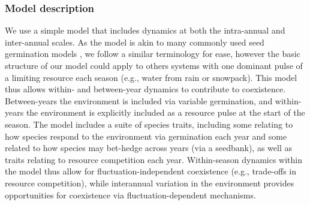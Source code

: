 \documentclass[11pt,letterpaper]{article}
\begin{document}
\subsubsection{Model description}
We use a simple model that includes dynamics at both the intra-annual and inter-annual scales. As the model is akin to many commonly used seed germination models \citep{Chesson:2004eo}, we follow a similar terminology for ease, however the basic structure of our model could apply to others systems with one dominant pulse of a limiting resource each season (e.g., water from rain or snowpack).  This model thus allows within- and between-year dynamics to contribute to coexistence. Between-years the environment is included via variable germination, and within-years the environment is explicitly included as a resource pulse at the start of the season. The model includes a suite of species traits, including some relating to how species respond to the environment via germination each year and some related to how species may bet-hedge across years (via a seedbank), as well as traits relating to resource competition each year. Within-season dynamics within the model thus allow for fluctuation-independent coexistence (e.g., trade-offs in resource competition), while interannual variation in the environment provides opportunities for coexistence via fluctuation-dependent mechanisms. 

\end{document}
